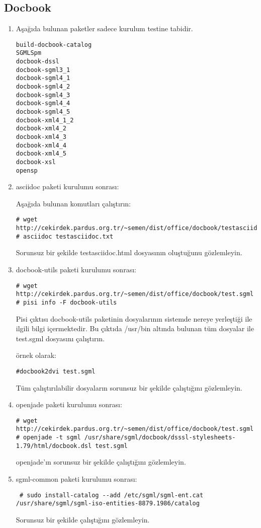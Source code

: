 \documentclass[a4paper,10pt]{article}
\begin{document}
\subsection*{Docbook}
\begin{enumerate}
 \item Aşağıda bulunan paketler sadece kurulum testine tabidir.
\begin{verbatim}
build-docbook-catalog
SGMLSpm
docbook-dssl
docbook-sgml3_1
docbook-sgml4_1
docbook-sgml4_2
docbook-sgml4_3
docbook-sgml4_4
docbook-sgml4_5
docbook-xml4_1_2
docbook-xml4_2
docbook-xml4_3
docbook-xml4_4
docbook-xml4_5
docbook-xsl
opensp
\end{verbatim}
 \item asciidoc paketi kurulumu sonrası:

Aşağıda bulunan komutları çalıştırın:
\begin{verbatim}
# wget http://cekirdek.pardus.org.tr/~semen/dist/office/docbook/testasciidoc.txt
# asciidoc testasciidoc.txt
\end{verbatim}

Sorunsuz bir şekilde testasciidoc.html dosyasının oluştuğunu gözlemleyin.

\item docbook-utils paketi kurulumu sonrası:
\begin{verbatim}
# wget http://cekirdek.pardus.org.tr/~semen/dist/office/docbook/test.sgml
# pisi info -F docbook-utils
\end{verbatim}

Pisi çıktısı docbook-utils paketinin dosyalarının sistemde nereye yerleştiği ile ilgili bilgi içermektedir. Bu çıktıda /usr/bin altında bulunan tüm dosyalar ile test.sgml dosyasını çalıştırın.

örnek olarak:
\begin{verbatim}
#docbook2dvi test.sgml
\end{verbatim}

Tüm çalıştırılabilir dosyaların sorunsuz bir şekilde çalıştığını gözlemleyin.

\item openjade paketi kurulumu sonrası:
\begin{verbatim}
# wget http://cekirdek.pardus.org.tr/~semen/dist/office/docbook/test.sgml
# openjade -t sgml /usr/share/sgml/docbook/dsssl-stylesheets-1.79/html/docbook.dsl test.sgml
\end{verbatim}

openjade'ın sorunsuz bir şekilde çalıştığını gözlemleyin.

\item sgml-common paketi kurulumu sonrası:
\begin{verbatim}
 # sudo install-catalog --add /etc/sgml/sgml-ent.cat /usr/share/sgml/sgml-iso-entities-8879.1986/catalog
\end{verbatim}

Sorunsuz bir şekilde çalıştığını gözlemleyin.


\end{enumerate}
\end{document}
